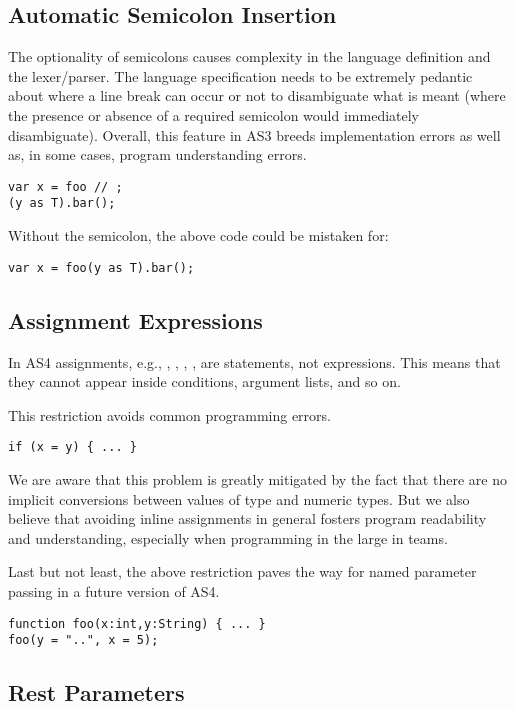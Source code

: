 \subsection{Automatic Semicolon Insertion}

The optionality of semicolons causes complexity in the language definition and
the lexer/parser. The language specification needs to be extremely pedantic
about where a line break can occur or not to disambiguate what is meant (where
the presence or absence of a required semicolon would immediately disambiguate).
Overall, this feature in AS3 breeds implementation errors as well as, in some
cases, program understanding errors.

\begin{verbatim}
var x = foo // ;
(y as T).bar();
\end{verbatim}
Without the semicolon, the above code could be mistaken for:
\begin{verbatim}
var x = foo(y as T).bar();
\end{verbatim}


\subsection{Assignment Expressions}

In AS4 assignments, e.g., , ,
, , are statements, not
expressions. This means that they cannot appear inside
conditions, argument lists, and so on.

This restriction avoids common programming errors.
\begin{verbatim}
if (x = y) { ... }
\end{verbatim}
We are aware that this problem is greatly mitigated by the fact that there are no implicit conversions between values of
type  and numeric types. But we also believe that avoiding inline assignments in general fosters program
readability and understanding, especially when programming in the large in teams.

Last but not least, the above restriction paves the way for named parameter passing in a future version of AS4.
\begin{verbatim}
function foo(x:int,y:String) { ... }
foo(y = "..", x = 5);
\end{verbatim}

\subsection{Rest Parameters}

